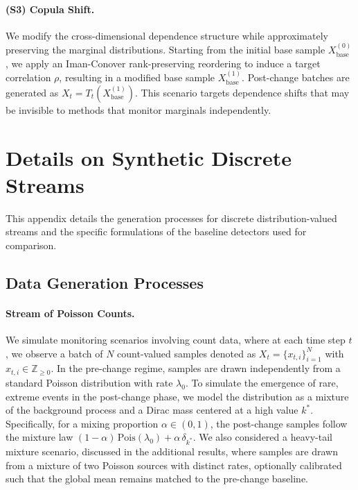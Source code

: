\documentclass{article}
\theoremstyle{plain}
\theoremstyle{definition}
\theoremstyle{remark}
\begin{document}
\paragraph{(S3) Copula Shift.}We modify the cross-dimensional dependence structure while approximately preserving the marginal distributions. 
Starting from the initial base sample $X_{\mathrm{base}}^{(0)}$, we apply an Iman-Conover rank-preserving reordering to induce a target correlation $\rho$, resulting in a modified base sample $X_{\mathrm{base}}^{(1)}$. 
Post-change batches are generated as $X_t = T_t(X_{\mathrm{base}}^{(1)})$. 
This scenario targets dependence shifts that may be invisible to methods that monitor marginals independently.


\section{Details on Synthetic Discrete Streams}
\label{app:sim_details_dist}

This appendix details the generation processes for discrete distribution-valued streams and the specific formulations of the baseline detectors used for comparison.

\subsection{Data Generation Processes}

\paragraph{Stream of Poisson Counts.}
We simulate monitoring scenarios involving count data, where at each time step $t$, we observe a batch of $N$ count-valued samples denoted as $X_{t} = \{x_{t,i}\}_{i=1}^{N}$ with $x_{t,i} \in \mathbb{Z}_{\ge 0}$. In the pre-change regime, samples are drawn independently from a standard Poisson distribution with rate $\lambda_0$. To simulate the emergence of rare, extreme events in the post-change phase, we model the distribution as a mixture of the background process and a Dirac mass centered at a high value $k^*$. Specifically, for a mixing proportion $\alpha \in (0,1)$, the post-change samples follow the mixture law $(1-\alpha)\,\mathrm{Pois}(\lambda_0) + \alpha\,\delta_{k^*}$. We also considered a heavy-tail mixture scenario, discussed in the additional results, where samples are drawn from a mixture of two Poisson sources with distinct rates, optionally calibrated such that the global mean remains matched to the pre-change baseline.
\end{document}

